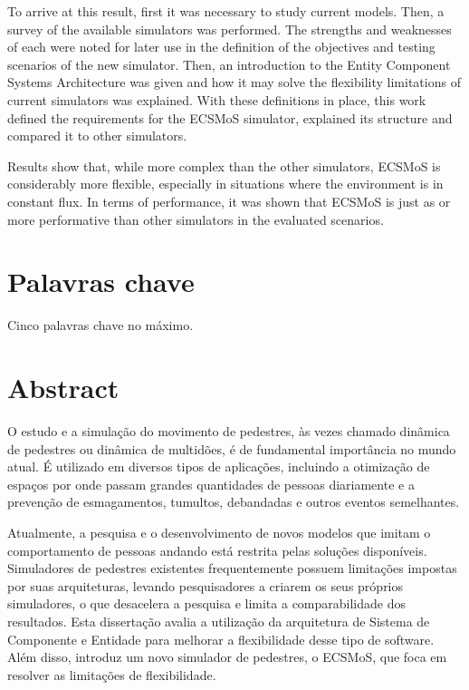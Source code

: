 \documentclass[twoside, 11pt]{article}
\begin{document}
To arrive at this result, first it was necessary to study current models. Then, a survey of the available simulators was performed. The strengths and weaknesses of each were noted for later use in the definition of the objectives and testing scenarios of the new simulator. Then, an introduction to the Entity Component Systems Architecture was given and how it may solve the flexibility limitations of current simulators was explained. With these definitions in place, this work defined the requirements for the ECSMoS simulator, explained its structure and compared it to other simulators. 

Results show that, while more complex than the other simulators, ECSMoS is considerably more flexible, especially in situations where the environment is in constant flux. In terms of performance, it was shown that ECSMoS is just as or more performative than other simulators in the evaluated scenarios. 

\section*{Palavras chave}

Cinco palavras chave no máximo.

\clearpage            %
\null                %
\newpage             %

\section*{Abstract}

O estudo e a simulação do movimento de pedestres, às vezes chamado dinâmica de pedestres ou dinâmica de multidões, é de fundamental importância no mundo atual. É utilizado em diversos tipos de aplicações, incluindo a otimização de espaços por onde passam grandes quantidades de pessoas diariamente e a prevenção de esmagamentos, tumultos, debandadas e outros eventos semelhantes.

Atualmente, a pesquisa e o desenvolvimento de novos modelos que imitam o comportamento de pessoas andando está restrita pelas soluções disponíveis. Simuladores de pedestres existentes frequentemente possuem limitações impostas por suas arquiteturas, levando pesquisadores a criarem os seus próprios simuladores, o que desacelera a pesquisa e limita a comparabilidade dos resultados. Esta dissertação avalia a utilização da arquitetura de Sistema de Componente e Entidade para melhorar a flexibilidade desse tipo de software. Além disso, introduz um novo simulador de pedestres, o ECSMoS, que foca em resolver as limitações de flexibilidade.
\end{document}
